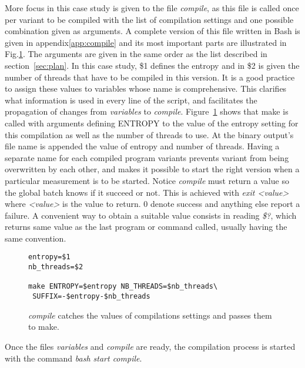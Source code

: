 More focus in this case study is given to the file \emph{compile}, as this file is called once per variant to be compiled with the list of compilation settings and one possible combination given as arguments. A complete version of this file written in Bash is given in appendix\ref{app:compile} and its most important parts are illustrated in Fig.\ref{fig:compile}. The arguments are given in the same order as the list described in section~\ref{sec:plan}. In this case study, \$1 defines the entropy and in \$2 is given the number of threads that have to be compiled in this version. It is a good practice to assign these values to variables whose name is comprehensive. This clarifies what information is used in every line of the script, and facilitates the propagation of changes from \emph{variables} to \emph{compile}. Figure~\ref{fig:compile} shows that make is called with arguments defining {ENTROPY} to the value of the entropy setting for this compilation as well as the number of threads to use. At the binary output's file name is appended the value of entropy and number of threads. Having a separate name for each compiled program variants prevents variant from being overwritten by each other, and makes it possible to start the right version when a particular measurement is to be started. Notice \emph{compile} must return a value so the global batch knows if it succeed or not. This is achieved with \emph{exit <value>} where \emph{<value>} is the value to return. 0 denote success and anything else report a failure. A convenient way to obtain a suitable value consists in reading \emph{\$?}, which returns same value as the last program or command called, usually having the same convention.

\begin{figure}
\centering
\begin{lstlisting}
entropy=$1
nb_threads=$2

make ENTROPY=$entropy NB_THREADS=$nb_threads\
 SUFFIX=-$entropy-$nb_threads
\end{lstlisting}
\caption{\emph{compile} catches the values of compilations settings and passes them to make.}
\label{fig:compile}
\end{figure}

Once the files \emph{variables} and \emph{compile} are ready, the compilation process is started with the command \emph{bash start compile}.

